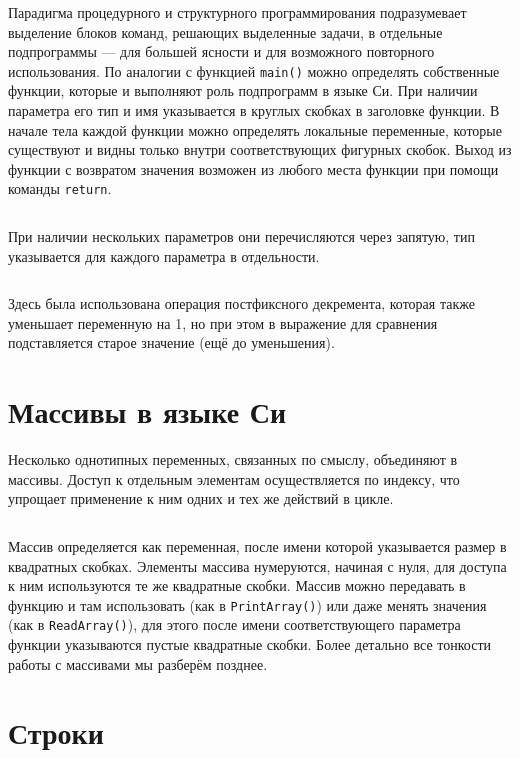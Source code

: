 Парадигма процедурного и структурного программирования подразумевает выделение
блоков команд, решающих выделенные задачи, в отдельные подпрограммы --- для
большей ясности и для возможного повторного использования. По аналогии с
функцией \texttt{main()} можно определять собственные функции, которые и
выполняют роль подпрограмм в языке Си. При наличии параметра его тип и имя
указывается в круглых скобках в заголовке функции. В начале тела каждой
функции можно определять локальные переменные, которые существуют и видны
только внутри соответствующих фигурных скобок. Выход из функции с возвратом
значения возможен из любого места функции при помощи команды \texttt{return}.
%
\inputminted{c}{samples/factorial.c}

При наличии нескольких параметров они перечисляются через запятую, тип
указывается для каждого параметра в отдельности.
%
\inputminted{c}{samples/power.c}

Здесь была использована операция постфиксного декремента, которая также
уменьшает переменную на 1, но при этом в выражение для сравнения подставляется
старое значение (ещё до уменьшения).


\section{Массивы в языке Си}

Несколько однотипных переменных, связанных по смыслу, объединяют в массивы.
Доступ к отдельным элементам осуществляется по индексу, что упрощает
применение к ним одних и тех же действий в цикле.
%
\inputminted{c}{samples/array.c}

Массив определяется как переменная, после имени которой указывается размер в
квадратных скобках. Элементы массива нумеруются, начиная с нуля, для доступа к
ним используются те же квадратные скобки. Массив можно передавать в функцию и
там использовать (как в \verb|PrintArray()|) или даже менять значения
(как в \verb|ReadArray()|), для этого после имени соответствующего параметра
функции указываются пустые квадратные скобки. Более детально все тонкости
работы с массивами мы разберём позднее.


\section{Строки}

